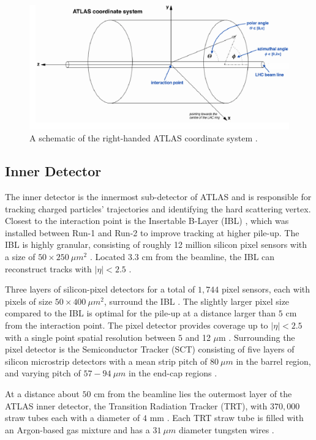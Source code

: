 \begin{figure}[!htbp]
    \centering
    \includegraphics[width=.98\linewidth]{figures/LHC/ATLAS_CoordinateSys.png}
    \caption{ A schematic of the right-handed ATLAS coordinate system \cite{ATLAS_CoordSys}.\label{fig:ATLAS_CS}}
\end{figure}

\subsection{Inner Detector}
\label{subsec:ID}
The inner detector is the innermost sub-detector of ATLAS and is responsible for tracking charged particles' trajectories and identifying the hard scattering vertex. Closest to the interaction point is the Insertable B-Layer (IBL) \cite{ATLAS_IBL}, which was installed between Run-1 and Run-2 to improve tracking at higher pile-up. The IBL is highly granular, consisting of roughly 12 million silicon pixel sensors with a size of $50\times 250 ~\mu m^2$ \cite{ATLAS_IBL}. Located $3.3$ cm from the beamline, the IBL can reconstruct tracks with $|\eta|<2.5$ \cite{ATLAS_IBL}. 

Three layers of silicon-pixel detectors for a total of $1,744$ pixel sensors, each with pixels of size $50\times 400 ~\mu m^2$, surround the IBL \cite{ID_Pixel}. The slightly larger pixel size compared to the IBL is optimal for the pile-up at a distance larger than $5$ cm from the interaction point. The pixel detector provides coverage up to $|\eta|<2.5$ with a single point spatial resolution between $5$ and 12 $\mu$m \cite{ID_Pixel}. Surrounding the pixel detector is the Semiconductor Tracker (SCT) consisting of five layers of silicon microstrip detectors with a mean strip pitch of $80 ~\mu m$ in the barrel region, and varying pitch of  $57-94 ~\mu m$ in the end-cap regions \cite{ID_Strips}. 

At a distance about $50$ cm from the beamline lies the outermost layer of the ATLAS inner detector, the Transition Radiation Tracker (TRT), with $370,000$ straw tubes each with a diameter of $4$ mm \cite{ID_TRT}. Each TRT straw tube is filled with an Argon-based gas mixture and has a $31~\mu m$ diameter tungsten wires \cite{ID_TRT}. 

